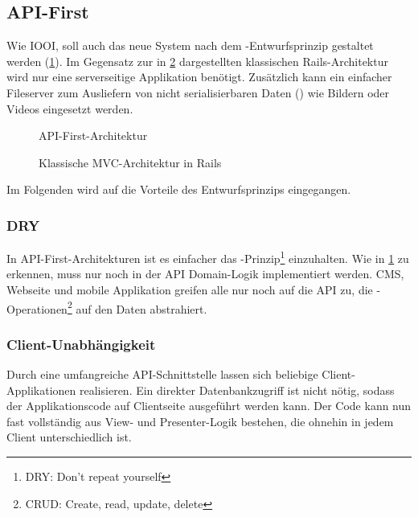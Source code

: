 \subsection{API-First}
\label{ssec:ea_api_first}

Wie IOOI, soll auch das neue System nach dem
-Entwurfsprinzip \cite{api-first} gestaltet werden
(\cref{fig:api_first_architektur}).  Im Gegensatz zur in
\cref{fig:klassische_rails_architektur} dargestellten klassischen
Rails-Architektur wird nur eine serverseitige Applikation benötigt.  Zusätzlich
kann ein einfacher Fileserver zum Ausliefern von nicht serialisierbaren Daten
() wie Bildern oder Videos eingesetzt werden.

\begin{figure}[h]
	\centering
	
	\caption{API-First-Architektur}
	\label{fig:api_first_architektur}
\end{figure}

\begin{figure}[h]
	\centering
	
	\caption{Klassische MVC-Architektur in Rails}
	\label{fig:klassische_rails_architektur}
\end{figure}

Im Folgenden wird auf die Vorteile des Entwurfsprinzips eingegangen.

\subsubsection{DRY}
\label{sssec:eaa_dry}

In API-First-Architekturen ist es einfacher das
-Prinzip\footnote{DRY: Don't repeat yourself} einzuhalten.  Wie
in \cref{fig:api_first_architektur} zu erkennen, muss nur noch in der
API Domain-Logik implementiert werden.  CMS, Webseite und mobile Applikation
greifen alle nur noch auf die API zu, die
-Operationen\footnote{CRUD: Create, read, update,
delete} auf den Daten abstrahiert.

\subsubsection{Client-Unabhängigkeit}
\label{sssec:eaa_client_unabhaengigkeit}

Durch eine umfangreiche API-Schnittstelle lassen sich beliebige
Client-Applikationen realisieren.  Ein direkter Datenbankzugriff ist nicht
nötig, sodass der Applikationscode auf Clientseite ausgeführt werden kann.  Der
Code kann nun fast vollständig aus View- und Presenter-Logik bestehen, die
ohnehin in jedem Client unterschiedlich ist.

